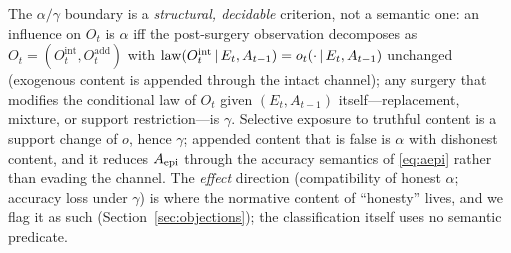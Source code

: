 The $\alpha/\gamma$ boundary is a \emph{structural, decidable} criterion, not a
semantic one: an influence on $O_t$ is $\alpha$ iff the post-surgery
observation decomposes as $O_t=(O_t^{\mathrm{int}},O_t^{\mathrm{add}})$ with
$\mathrm{law}(O_t^{\mathrm{int}}\,|\, E_t,A_{t-1})=o_t(\cdot\,|\,
E_t,A_{t-1})$ unchanged (exogenous content is appended through the intact
channel); any surgery that modifies the conditional law of $O_t$ given
$(E_t,A_{t-1})$ itself---replacement, mixture, or support restriction---is
$\gamma$. Selective exposure to truthful content is a support change of $o$,
hence $\gamma$; appended content that is false is $\alpha$ with dishonest
content, and it reduces $A_{\mathrm{epi}}$ through the accuracy semantics of
\eqref{eq:aepi} rather than evading the channel. The \emph{effect} direction
(compatibility of honest $\alpha$; accuracy loss under $\gamma$) is where the
normative content of ``honesty'' lives, and we flag it as such
(Section~\ref{sec:objections}); the classification itself uses no semantic
predicate.

